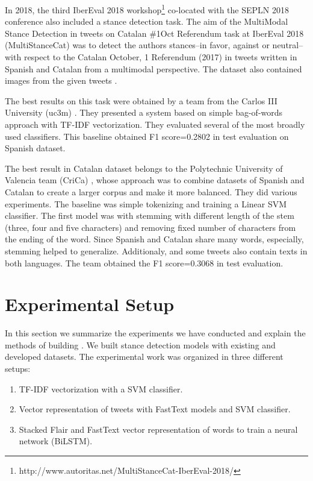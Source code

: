\documentclass[10pt, a4paper]{article}
\begin{document}
In 2018, the third IberEval 2018 workshop\footnote{http://www.autoritas.net/MultiStanceCat-IberEval-2018/} co-located with the SEPLN 2018 conference also included a stance detection task. The aim of the MultiModal Stance Detection in tweets on Catalan \#1Oct Referendum task at IberEval 2018 (MultiStanceCat) was to detect the authors stances--in favor, against or neutral-- with respect to the Catalan October, 1 Referendum (2017) in tweets written in Spanish and Catalan from a multimodal perspective. The dataset also contained images from the given tweets \cite{taule18}.

The best results on this task were obtained by a team from the Carlos III University (uc3m) \cite{Segura-Bedmar18}. They presented a system based on simple bag-of-words approach with TF-IDF vectorization. They evaluated several of the most broadly used classifiers. This baseline obtained F1 score=0.2802 in test evaluation on Spanish dataset.


The best result in Catalan dataset belongs to the Polytechnic University of Valencia team (CriCa) \cite{Cuquerella2018CriCaTM}, whose approach was to combine datasets of Spanish and Catalan to create a larger corpus and make it more balanced. They did various experiments. The baseline was simple tokenizing and training a Linear SVM classifier. The first model was with stemming with different length of the stem (three, four and five characters) and removing fixed number of characters from the ending of the word. Since Spanish and Catalan share many words, especially, stemming helped to generalize. Additionaly, and some tweets also contain texts in both languages. The team obtained the F1 score=0.3068 in test evaluation.

\section{Experimental Setup}
\label{sec:experiment}

In this section we summarize the experiments we have conducted and explain the methods of building . We built stance detection models with existing and developed datasets. The experimental work was organized in three different setups:

\begin{enumerate}
\item TF-IDF vectorization with a SVM classifier.
\item Vector representation of tweets with FastText models and SVM classifier.
\item Stacked Flair and FastText vector representation of words to train a neural network (BiLSTM).
\end{enumerate}
\end{document}
